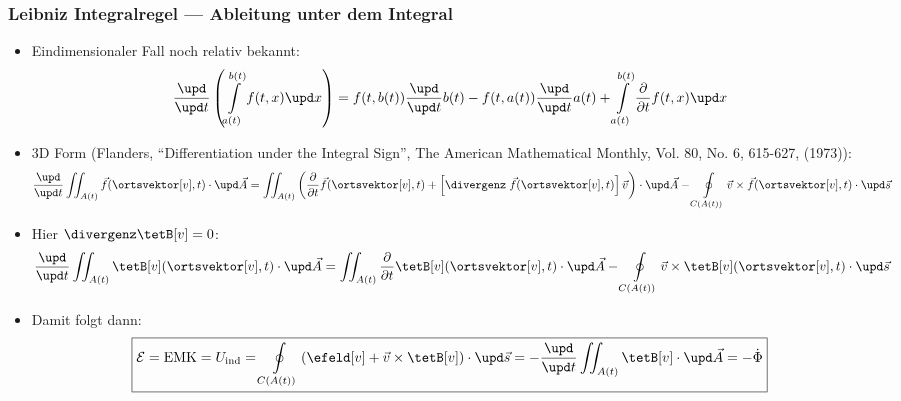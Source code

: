 \begin{frame}
  \frametitle{Leibniz Integralregel --- Ableitung unter dem Integral}
  \begin{itemize}[<+->]
  \item Eindimensionaler Fall noch relativ bekannt:
    $$
    \frac{\upd}{\upd t} \left( \int\displaylimits_{a(t)}^{b(t)} f(t,x)\upd x \right) = f(t,b(t)) \frac{\upd }{\upd t}b(t)  - f(t,a(t)) \frac{\upd }{\upd t}a(t) +  \int\displaylimits_{a(t)}^{b(t)} \frac{\partial}{\partial t}f(t,x)\upd x 
    $$
  \item 3D Form (Flanders, \enquote{Differentiation under the Integral Sign}, The American Mathematical Monthly, Vol. 80, No. 6, 615-627, (1973)):
    $$
    \frac{\upd}{\upd t}  \iint_{A(t)} \vec{f} (\ortsvektor[v], t) \cdot \upd\vec{A} = \iint_{A(t)} \left( \frac{\partial}{\partial t}\vec{f}(\ortsvektor[v], t) + \left[ \divergenz\; \vec{f}(\ortsvektor[v], t) \right] \vec{v} \right) \cdot \upd\vec{A} - \oint\displaylimits_{C(A(t))}
    \vec{v} \times  \vec{f}(\ortsvektor[v], t) \cdot \upd\vec{s}   $$
  \item Hier \(\divergenz \tetB[v]=0\):
    $$
    \frac{\upd}{\upd t}  \iint_{A(t)} \tetB[v] (\ortsvektor[v], t) \cdot \upd\vec{A} = \iint_{A(t)} \frac{\partial}{\partial t}\tetB[v](\ortsvektor[v], t) \cdot \upd\vec{A} - \oint\displaylimits_{C(A(t))}
    \vec{v} \times \tetB[v](\ortsvektor[v], t) \cdot \upd\vec{s}   $$
  \item Damit folgt dann:
    $$
   \boxed{\mathcal{E}=\text{EMK}=U_\text{ind} = \oint\displaylimits_{C(A(t))} \left( \efeld[v] + \vec{v} \times \tetB[v]\right) \cdot\upd\vec{s} = - \frac{\upd}{\upd t}  \iint_{A(t)} \tetB[v] \cdot \upd\vec{A}  = -\dot{\Phi}}
    $$
\end{itemize}
\end{frame}


